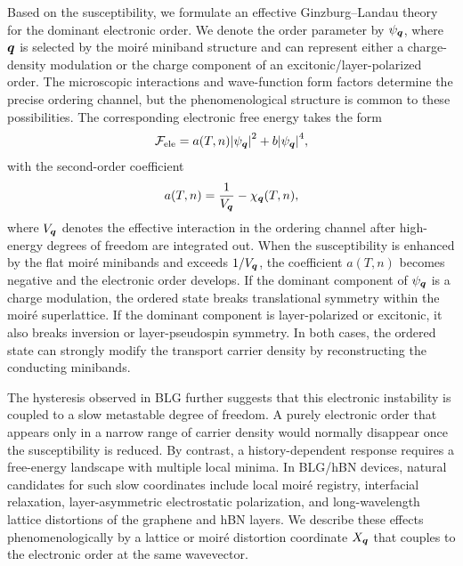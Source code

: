 \documentclass[aps,prx,article,twocolumn,amsmath,amssymb,superscriptaddress,longbibliography]{revtex4-2}
\begin{document}
Based on the susceptibility, we formulate an effective Ginzburg--Landau theory for the dominant electronic order. We denote the order parameter by $\psi_{\vb*{q}}$, where $\vb*{q}$ is selected by the moiré miniband structure and can represent either a charge-density modulation or the charge component of an excitonic/layer-polarized order. The microscopic interactions and wave-function form factors determine the precise ordering channel, but the phenomenological structure is common to these possibilities. The corresponding electronic free energy takes the form
\begin{align}\label{eq:electronFreeEnergy}
\mathcal{F}_{\rm ele} =
a(T,n)\abs{\psi_{\vb*{q}}}^2 + b\abs{\psi_{\vb*{q}}}^4,
\end{align}
with the second-order coefficient
\begin{align}\label{eq:electronCoefficient}
a(T,n) = \frac{1}{V_{\vb*{q}}} - \chi_{\vb*{q}}(T,n),
\end{align}
where $V_{\vb*{q}}$ denotes the effective interaction in the ordering channel after high-energy degrees of freedom are integrated out. When the susceptibility is enhanced by the flat moiré minibands and exceeds $1/V_{\vb*{q}}$, the coefficient $a(T,n)$ becomes negative and the electronic order develops. If the dominant component of $\psi_{\vb*{q}}$ is a charge modulation, the ordered state breaks translational symmetry within the moiré superlattice. If the dominant component is layer-polarized or excitonic, it also breaks inversion or layer-pseudospin symmetry. In both cases, the ordered state can strongly modify the transport carrier density by reconstructing the conducting minibands.

The hysteresis observed in BLG further suggests that this electronic instability is coupled to a slow metastable degree of freedom. A purely electronic order that appears only in a narrow range of carrier density would normally disappear once the susceptibility is reduced. By contrast, a history-dependent response requires a free-energy landscape with multiple local minima. In BLG/hBN devices, natural candidates for such slow coordinates include local moiré registry, interfacial relaxation, layer-asymmetric electrostatic polarization, and long-wavelength lattice distortions of the graphene and hBN layers. We describe these effects phenomenologically by a lattice or moiré distortion coordinate $X_{\vb*{q}}$ that couples to the electronic order at the same wavevector.
\end{document}
